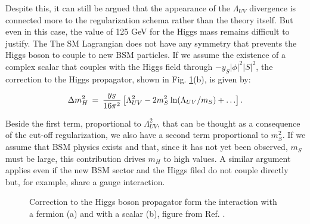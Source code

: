 Despite this, it can still be argued that the appearance of the $\Lambda_{UV}$ divergence is connected more to the regularization schema rather than the theory itself. But even in this case, the value of 125 GeV for the Higgs mass remains difficult to justify. The The SM Lagrangian does not have any symmetry that prevents the Higgs boson to couple to new BSM particles. If we assume the existence of a complex scalar that couples with the Higgs field through $ -y_S|\phi|^2 |S|^2$, the correction to the Higgs propagator, shown in Fig. \ref{fig:sm:h_corr}(b), is given by:

\begin{equation}
\Delta m_H^2 \>=\> {y_S\over 16 \pi^2}
\left [\Lambda_{UV}^2 - 2 m_S^2
\> {\rm ln}(\Lambda_{UV}/m_S) + \ldots
\right ].
\label{eq:divhs}
\end{equation}

Beside the first term, proportional to $\Lambda_{UV}^2$, that can be thought as a consequence of the cut-off regularization, we also have a second  term proportional to $m_S^2$. If we assume that BSM physics exists and that, since it has not yet been observed, $m_S$ must be large, this contribution drives $m_H$ to high values. A similar argument applies even if the new BSM sector and the Higgs filed do not couple directly but, for example, share a gauge interaction.

\begin{figure}[ht]
\centering
{}
\caption{Correction to the Higgs boson propagator form the interaction with a fermion (a) and with a scalar (b), figure from Ref. \cite{Martin:1997ns}.}
\label{fig:sm:h_corr}
\end{figure}

